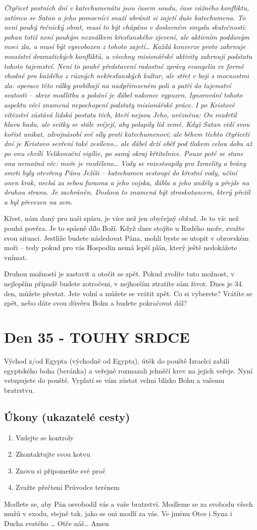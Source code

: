 \documentclass[11pt]{article}
\newcommand{\zacatekPatyTyden}{
  Východ z/od Egypta (východně od Egypta), útěk do pouště \newline
  Izraelci zabili egyptského boha (beránka) a veřejně rozmazali jehněčí krev na jejich veřeje. Nyní vstupujete
  do pouště. Vyplatí se vám zůstat velmi blízko Bohu a vašemu bratrstvu.

\subsection*{Úkony (ukazatelé cesty)}
\begin{enumerate}
  \item Vzdejte se kontroly
  \item Zkontaktujte svou kotvu
  \item Znovu si připomeňte své proč
  \item Zvažte přečtení Průvodce terénem
\end{enumerate}
Modlete se, aby Pán osvobodil vás a vaše bratrství. \newline
Modleme se za svobodu všech mužů v exodu, stejně tak, jako se oni modlí za vás.\newline
Ve jménu Otce i Syna i Ducha svatého …  Otče náš… Amen
}
\begin{document}
\textit{Čtyřicet postních dní v katechumenátu jsou časem soudu, čase vážného konfliktu, zatímco se
Satan a jeho pomocníci snaží ubránit si zajetí duše katechumena. To není pouhý řečnický obrat,
musí to být chápáno v doslovném smyslu skutečnosti: pohan totiž není pouhým neználkem
křesťanského zjevení, ale aktivním poddaným moci zla, a musí být vysvobozen z tohoto zajetí…
Každá konverze proto zahrnuje množství dramatických konfliktů, a všechny misionářské aktivity
zahrnují podstatu tohoto tajemství. Není to pouhé představení radostné zprávy evangelia ve
formě vhodné pro každého z různých nekřesťanských kultur, ale střet v boji s mocnostmi zla:
operace této války probíhají na nadpřirozeném poli a patří do tajemství svatosti – skrze modlitbu
a pokání je ďábel nakonec vypuzen. Ignorování tohoto aspektu věci znamená nepochopení
podstaty misionářské práce. I po Kristově vítězství zůstává lidská postata těch, kteří nejsou Jeho,
uvězněna: On rozdrtil hlavu hadu, ale svitky se stále svíjejí, aby polapily lid země. Když Satan
vidí svou kořist unikat, zdvojnásobí své síly proti katechumenovi; ale během těchto čtyřiceti dní je
Kristovo sevření také zesíleno… ale ďábel drží oběť pod tlakem celou dobu až po onu chvíli
Velikonoční vigílie, po samý okraj křtitelnice. Pouze poté se stane ona nemožná věc: moře je
rozděleno…
Vody se rozestoupily pro Izraelity a brány smrti byly otevřeny Pánu Ježíši – katechumen sestoupí
do křestní vody, učiní onen krok, nechá za sebou faraona a jeho vojska, ďábla a jeho anděly a
přejde na druhou stranu. Je zachráněn. Doslova to znamená být ztroskotancem, který přežil a byl
převezen na zem.}

Křest, nám daný pro naši spásu, je více než jen obyčejný obřad. Je to víc než pouhá pověra. Je to spásné dílo
Boží. Když dnes stojíte u Rudého moře, zvažte svou situaci. Jestliže budete následovat Pána, mohli byste se
utopit v obrovském moři – tedy pokud pro vás Hospodin nemá lepší plán, který ještě nedokážete vnímat.

Druhou možností je zastavit a otočit se zpět. Pokud zvolíte tuto možnost, v nejlepším případě budete
zotročeni, v nejhorším ztratíte sám život. Dnes je 34. den, můžete přestat. Jste volní a můžete se vrátit zpět.
Co si vyberete? Vrátíte se zpět, nebo dáte svou důvěru Bohu a budete pokračovat dál?

\newpage
\section{Den 35 - TOUHY SRDCE}
\zacatekPatyTyden
\end{document}
